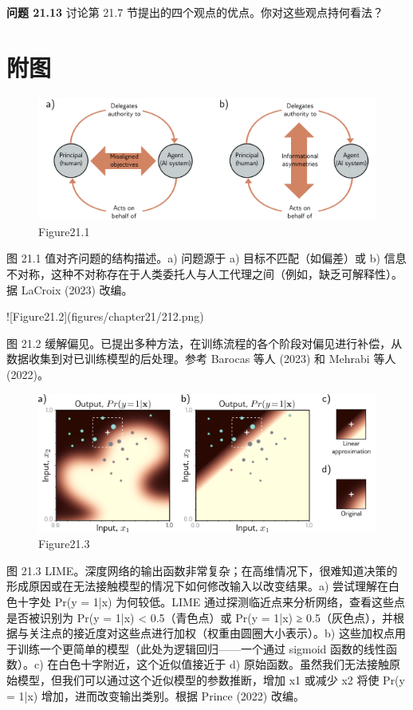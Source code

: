 \textbf{问题 21.13} 讨论第 21.7 节提出的四个观点的优点。你对这些观点持何看法？


\section{附图}

\begin{figure}[ht!]
\centering
\includegraphics[width=0.7\linewidth]{png/chapter21/EthicsStructural.png}
\caption{Figure21.1}
\end{figure}


图 21.1 值对齐问题的结构描述。a) 问题源于 a) 目标不匹配（如偏差）或 b) 信息不对称，这种不对称存在于人类委托人与人工代理之间（例如，缺乏可解释性）。据 LaCroix (2023) 改编。

![Figure21.2](figures/chapter21/212.png)

图 21.2 缓解偏见。已提出多种方法，在训练流程的各个阶段对偏见进行补偿，从数据收集到对已训练模型的后处理。参考 Barocas 等人 (2023) 和 Mehrabi 等人 (2022)。

\begin{figure}[ht!]
\centering
\includegraphics[width=0.7\linewidth]{png/chapter21/EthicsLIME.png}
\caption{Figure21.3}
\end{figure}

图 21.3 LIME。深度网络的输出函数非常复杂；在高维情况下，很难知道决策的形成原因或在无法接触模型的情况下如何修改输入以改变结果。a) 尝试理解在白色十字处 Pr(y = 1|x) 为何较低。LIME 通过探测临近点来分析网络，查看这些点是否被识别为 Pr(y = 1|x) < 0.5（青色点）或 Pr(y = 1|x) ≥ 0.5（灰色点），并根据与关注点的接近度对这些点进行加权（权重由圆圈大小表示）。b) 这些加权点用于训练一个更简单的模型（此处为逻辑回归——一个通过 sigmoid 函数的线性函数）。c) 在白色十字附近，这个近似值接近于 d) 原始函数。虽然我们无法接触原始模型，但我们可以通过这个近似模型的参数推断，增加 x1 或减少 x2 将使 Pr(y = 1|x) 增加，进而改变输出类别。根据 Prince (2022) 改编。
